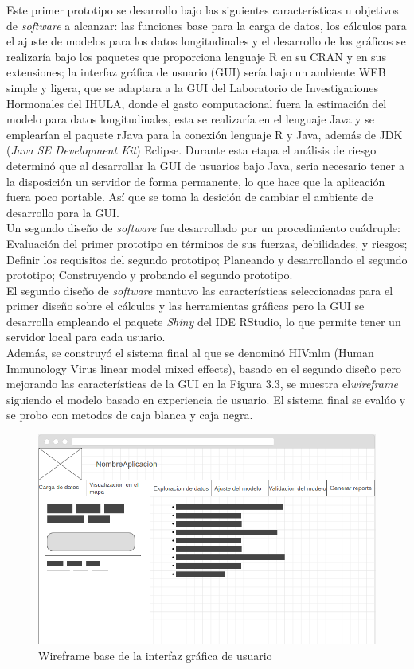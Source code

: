 Este primer prototipo se desarrollo bajo las siguientes caracter\'isticas u objetivos de \textit{software} a alcanzar:  las funciones base para la carga de datos, los c\'alculos para el ajuste de modelos para los datos longitudinales y el desarrollo de los gr\'aficos se realizar\'ia bajo los paquetes que proporciona lenguaje R en su CRAN y en sus extensiones; la interfaz gr\'afica de usuario (GUI)  ser\'ia bajo un ambiente WEB simple y ligera, que se adaptara a la GUI del Laboratorio de Investigaciones Hormonales del IHULA, donde el gasto computacional fuera la estimaci\'on del modelo para datos longitudinales, esta se realizar\'ia en el lenguaje Java y se emplear\'ian el  paquete rJava para la conexi\'on lenguaje R y Java, adem\'as de JDK (\textit{Java SE Development Kit}) Eclipse. Durante esta etapa el an\'alisis de riesgo determin\'o que al desarrollar la GUI de usuarios bajo Java, seria necesario tener a la disposici\'on un servidor de forma permanente, lo que hace que la aplicaci\'on fuera poco portable. As\'i que se toma la desici\'on de cambiar el ambiente de desarrollo para la GUI.\\ 

Un segundo diseño de \textit{software} fue desarrollado por un procedimiento cu\'adruple: Evaluaci\'on del primer prototipo en t\'erminos de sus fuerzas, debilidades, y riesgos; Definir los requisitos del segundo prototipo; Planeando y desarrollando el segundo prototipo; Construyendo y probando el segundo prototipo. \\

El segundo diseño de \textit{software} mantuvo las caracter\'isticas seleccionadas para el primer diseño sobre el c\'alculos y las herramientas gr\'aficas pero la GUI se desarrolla empleando el paquete \textit{Shiny} del IDE RStudio, lo que permite tener un servidor local para cada usuario. \\

Adem\'as, se construy\'o el sistema final al que se denomin\'o HIVmlm (Human Immunology Virus linear model mixed effects), basado en el segundo diseño pero mejorando las caracter\'isticas de la GUI en la  Figura 3.3, se  muestra el\textit{wireframe} siguiendo el modelo basado en experiencia de usuario. El sistema final se eval\'uo y se probo con metodos de caja blanca y caja negra.\\


\begin{figure}[H]
\centering
\includegraphics[scale=0.6]{etapa1_wireframe.png}
\caption{Wireframe base de la interfaz gr\'afica de usuario}
\end{figure}





